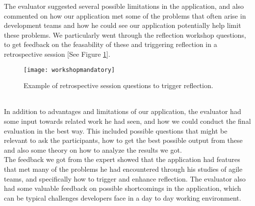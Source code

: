 The evaluator suggested several possible limitations in the application, and also commented on how our application met some of the problems that often arise in development teams and how he could see our application potentially help limit these problems. We particularly went through the reflection workshop questions, to get feedback on the feasability of these and triggering reflection in a retrospective session [See Figure \ref{workshopmandatoryexpertreview}]. 
\begin{figure}[h!]
    \centering
        \texttt{[image: workshopmandatory]}
    \caption{Example of retrospective session questions to trigger reflection.}
    \label{workshopmandatoryexpertreview}
\end{figure}
\\
In addition to advantages and limitations of our application, the evaluator had some input towards related work he had seen, and how we could conduct the final evaluation in the best way. This included possible questions that might be relevant to ask the participants, how to get the best possible output from these and also some theory on how to analyze the results we got. \\
The feedback we got from the expert showed that the application had features that met many of the problems he had encountered through his studies of agile teams, and specifically how to trigger and enhance reflection. The evaluator also had some valuable feedback on possible shortcomings in the application, which can be typical challenges developers face in a day to day working environment. 


